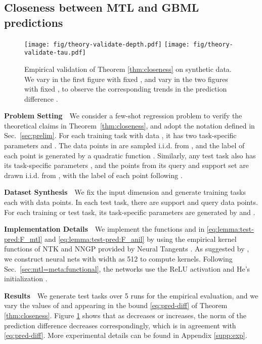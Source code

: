 \documentclass{article}
\begin{document}
\subsection{Closeness between MTL and GBML predictions}\label{sec:exp:theory-validate}
\begin{figure}[t!]
    \centering
    \hbox{\hspace{+1.25em}\texttt{[image: fig/theory-validate-depth.pdf]}}
    \texttt{[image: fig/theory-validate-tau.pdf]}
    \vspace*{-0.2em}
    \caption{Empirical validation of Theorem \ref{thm:closeness} on synthetic data. We vary  in the first figure with fixed , and vary  in the two figures with fixed , to observe the corresponding trends in the prediction difference .}\label{fig:thm-validate}
\vspace{-1em}
\end{figure}


\textbf{Problem Setting}~~We consider a few-shot regression problem to verify the theoretical claims in Theorem~\ref{thm:closeness}, and adopt the notation defined in Sec.~\ref{sec:prelim}. For each training task  with data , it has two task-specific parameters  and . The data points in  are sampled i.i.d. from , and the label of each point  is generated by a quadratic function . Similarly, any test task  also has its task-specific parameters , and the points from its query and support set  are drawn i.i.d. from , with the label of each point  following .

\textbf{Dataset Synthesis}~~We fix the input dimension  and generate  training tasks each with  data points. In each test task, there are  support and  query data points. For each training or test task, its task-specific parameters  are generated by  and . 

\textbf{Implementation Details}~~We implement the functions  and  in \eqref{eq:lemma:test-pred:F_mtl} and \eqref{eq:lemma:test-pred:F_anil} by using the empirical kernel functions of NTK and NNGP provided by Neural Tangents \cite{neuraltangents2020}. As suggested by \citet{neuraltangents2020}, we construct neural nets with width as 512 to compute kernels. Following Sec.~\ref{sec:mtl=meta:functional}, the networks use the ReLU activation and He's initialization \cite{resnet}.

\textbf{Results}~~We generate  test tasks over 5 runs for the empirical evaluation, and we vary the values of  and  appearing in the bound \eqref{eq:pred-diff} of Theorem \ref{thm:closeness}. Figure \ref{fig:thm-validate} shows that as  decreases or  increases, the norm of the prediction difference  decreases correspondingly, which is in agreement with \eqref{eq:pred-diff}. More experimental details can be found in Appendix \ref{supp:exp}.
\end{document}
